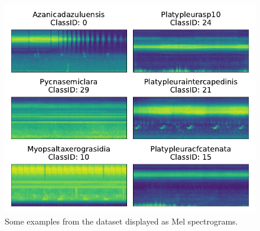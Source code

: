 \begin{figure}[H]
\centering
\captionsetup{width=0.8\linewidth}
\includegraphics{figures/compare_some_examples.pdf}
\caption{Some examples from the dataset displayed as Mel spectrograms.}
\label{fig:compare_some_examples}
\end{figure}

